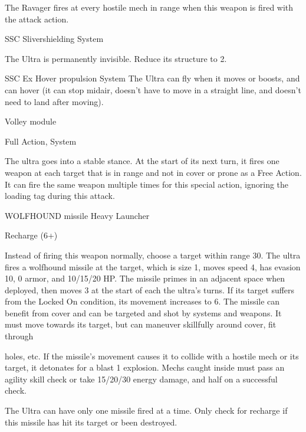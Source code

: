 The Ravager fires at every hostile mech in range when this weapon is fired with the attack action.


SSC Slivershielding
System

The Ultra is permanently invisible. Reduce its structure to 2.


SSC Ex Hover propulsion
System
The Ultra can fly when it moves or boosts, and can hover (it can stop midair, doesn’t have to
move in a straight line, and doesn’t need to land after moving).


Volley module

Full Action, System

The ultra goes into a stable stance. At the start of its next turn, it fires one weapon at each target
that is in range and not in cover or prone as a Free Action. It can fire the same weapon multiple
times for this special action, ignoring the loading tag during this attack.


WOLFHOUND missile
Heavy Launcher

Recharge (6+)

Instead of firing this weapon normally, choose a target within range 30. The ultra fires a
wolfhound missile at the target, which is size 1, moves speed 4, has evasion 10, 0 armor, and
10/15/20 HP. The missile primes in an adjacent space when deployed, then moves 3 at the start
of each the ultra’s turns. If its target suffers from the Locked On condition, its movement
increases to 6. The missile can benefit from cover and can be targeted and shot by systems and
weapons. It must move towards its target, but can maneuver skillfully around cover, fit through




holes, etc. If the missile’s movement causes it to collide with a hostile mech or its target, it
detonates for a blast 1 explosion. Mechs caught inside must pass an agility skill check or take
15/20/30 energy damage, and half on a successful check.


The Ultra can have only one missile fired at a time. Only check for recharge if this missile has hit
its target or been destroyed.